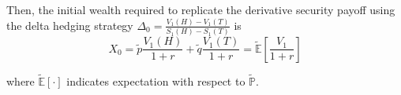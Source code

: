 \documentclass[12pt]{article}
\newlength\tindent
\renewcommand{\indent}{\hspace*{\tindent}}
\renewcommand{\P}{\mathbb P}
\newcommand{\E}{\mathbb E}
\begin{document}
\indent Then, the initial wealth required to replicate the derivative security payoff using the delta hedging strategy $\Delta_0 = \frac{V_1(H) - V_1(T)}{S_1(H) - S_1(T)}$ is
\begin{equation*}
	X_0 = \tilde{p}\frac{V_1(H)}{1 + r} + \tilde{q}\frac{V_1(T)}{1 + r} = \tilde{\E}\left[ \frac{V_1}{1 + r} \right]
\end{equation*}

where $\tilde{\E}[\cdot]$ indicates expectation with respect to $\tilde{\P}$.

\end{document}

